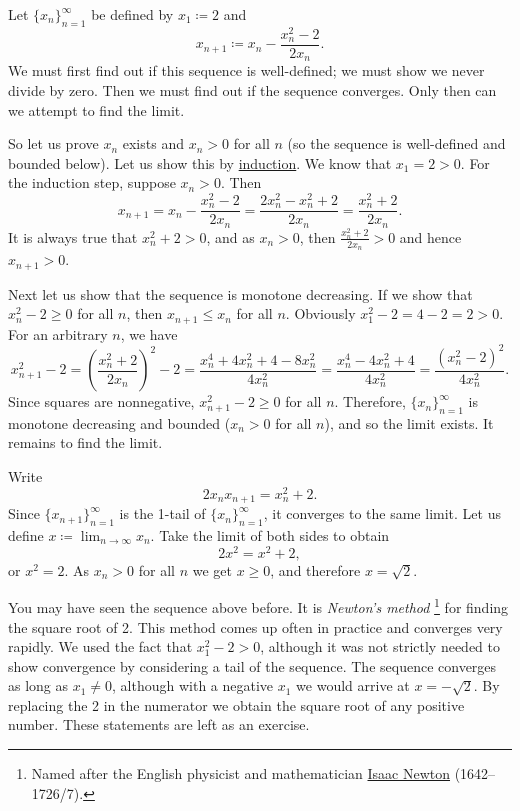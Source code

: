 \begin{example}
Let $\{ x_n \}_{n=1}^\infty$ be defined by $x_1 \coloneqq 2$ and
\begin{equation*}
x_{n+1} \coloneqq x_n - \frac{x_n^2-2}{2x_n} .
\end{equation*}
We must first find out if this sequence is well-defined; we must show we never
divide by zero.
Then we must find out if the sequence converges.  Only then
can we attempt to find the limit.

So let us prove 
$x_n$ exists and $x_n > 0$ for all $n$ (so the sequence is well-defined
and bounded below).
Let us show this by \hyperref[induction:thm]{induction}.  We know that
$x_1 = 2 > 0$.  For the induction step, suppose $x_n > 0$.  Then
\begin{equation*}
x_{n+1} = x_n - \frac{x_n^2-2}{2x_n} =
\frac{2x_n^2 - x_n^2+2}{2x_n} =
\frac{x_n^2+2}{2x_n} .
\end{equation*}
It is always true that $x_n^2+2 > 0$,
and as
$x_n > 0$, then $\frac{x_n^2+2}{2x_n} > 0$ and hence $x_{n+1} > 0$.

Next let us
show that the sequence is monotone decreasing.  If we show that
$x_n^2-2 \geq 0$ for all $n$, then $x_{n+1} \leq x_n$ for all $n$.
Obviously $x_1^2-2 = 4-2 = 2 > 0$.  For an arbitrary $n$, we have 
\begin{equation*}
x_{n+1}^2-2 =
{\left( \frac{x_n^2+2}{2x_n} \right)}^2 - 2
=
\frac{x_n^4+4x_n^2+4 - 8x_n^2}{4x_n^2}
=
\frac{x_n^4-4x_n^2+4}{4x_n^2}
=
\frac{{\left( x_n^2-2 \right)}^2}{4x_n^2} .
\end{equation*}
Since squares are nonnegative,
$x_{n+1}^2-2 \geq 0$ for all $n$.  Therefore,
$\{ x_n \}_{n=1}^\infty$ is monotone decreasing and bounded ($x_n > 0$ for all $n$), and 
so the limit exists.  It remains to find the limit.

Write
\begin{equation*}
2x_nx_{n+1} = x_n^2+2 .
\end{equation*}
Since $\{ x_{n+1} \}_{n=1}^\infty$ is the 1-tail of $\{ x_n \}_{n=1}^\infty$, it converges to the
same limit.  Let us define $x \coloneqq \lim_{n\to\infty} x_n$.  Take the limit of
both sides to obtain
\begin{equation*}
2x^2 = x^2+2 ,
\end{equation*}
or $x^2 = 2$.  As $x_n > 0$ for all $n$ we get $x \geq 0$, and therefore $x = \sqrt{2}$.
\end{example}

You may have seen the sequence above before.  It is
\emph{Newton's method}%
\footnote{%
Named after the English physicist and mathematician
\href{https://en.wikipedia.org/wiki/Isaac_Newton}{Isaac Newton}
(1642--1726/7).}
for finding the square root of 2.  This method comes up often in
practice and converges very rapidly.  We used the fact that
$x_1^2 -2 >0$, although it was not strictly needed to show convergence by
considering a tail of the sequence.
The sequence converges as long as $x_1 \not= 0$, although with a negative $x_1$
we would arrive at $x=-\sqrt{2}$.  By replacing the 2 in the numerator we 
obtain the square root of any positive number.  These statements are left as
an exercise.

